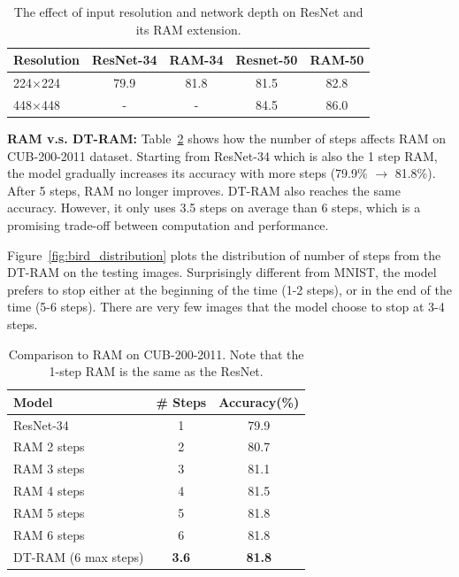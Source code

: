 \documentclass[10pt,twocolumn,letterpaper]{article}
\begin{document}
\begin{table}
  \centering
  \addtolength{\tabcolsep}{2.5pt}
    \begin{tabular}{l c c c c}
      \toprule[0.2 em]
      Resolution & ResNet-34 & RAM-34 & Resnet-50 & RAM-50 \\
      \toprule[0.2 em]
      224$\times$224 & 79.9 & 81.8 & 81.5 & 82.8 \\
      448$\times$448 & - & - & 84.5 & 86.0 \\
      \bottomrule[0.1 em]
    \end{tabular}
    \vspace{1pt}
    \caption{The effect of input resolution and network depth on ResNet and its RAM extension.}
    \label{tab:bird_resolution}
\end{table}

\textbf{RAM v.s. DT-RAM:} Table~\ref{tab:bird_ram} shows how the number of steps affects RAM on CUB-200-2011 dataset.
Starting from ResNet-34 which is also the 1 step RAM, the model gradually increases its accuracy with more steps (79.9\% $\rightarrow$ 81.8\%).
After 5 steps, RAM no longer improves.
DT-RAM also reaches the same accuracy.
However, it only uses 3.5 steps on average than 6 steps, which is a promising trade-off between computation and performance.

Figure~\ref{fig:bird_distribution} plots the distribution of number of steps from the DT-RAM on the testing images.
Surprisingly different from MNIST, the model prefers to stop either at the beginning of the time (1-2 steps), or in the end of the time (5-6 steps).
There are very few images that the model choose to stop at 3-4 steps.

\begin{table}
  \centering
  \addtolength{\tabcolsep}{2.5pt}
    \begin{tabular}{l c c}
      \toprule[0.2 em]
      Model & \# Steps & Accuracy(\%) \\
      \toprule[0.2 em]
      ResNet-34 & 1 & 79.9 \\
      RAM 2 steps & 2 & 80.7 \\
      RAM 3 steps & 3 & 81.1 \\
      RAM 4 steps & 4 & 81.5 \\
      RAM 5 steps & 5 & 81.8 \\
      RAM 6 steps & 6 & 81.8 \\
      \midrule
      DT-RAM (6 max steps) & {\bf 3.6} & {\bf 81.8} \\
      \bottomrule[0.1 em]
    \end{tabular}
    \vspace{1pt}
    \caption{Comparison to RAM on CUB-200-2011. Note that the 1-step RAM is the same as the ResNet.}
    \label{tab:bird_ram}
\end{table}
\end{document}
